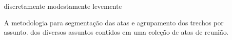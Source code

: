 
discretamente 
modestamente
levemente

A metodologia 
para segmentação das atas e agrupamento dos trechos por assunto.  
dos diversos assuntos contidos em uma coleção de atas de reunião.
















